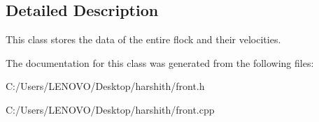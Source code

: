 \subsection{Detailed Description}
This class stores the data of the entire flock and their velocities. 

The documentation for this class was generated from the following files\+:\begin{DoxyCompactItemize}
\item 
C\+:/\+Users/\+L\+E\+N\+O\+V\+O/\+Desktop/harshith/front.\+h\item 
C\+:/\+Users/\+L\+E\+N\+O\+V\+O/\+Desktop/harshith/front.\+cpp\end{DoxyCompactItemize}
